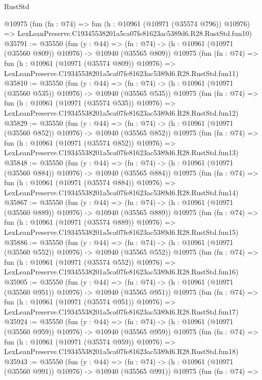 \begin{lexlean}{RustStd}
\begin{coremodule}
    @10975
    (fun (fn : @74) =>
    fun (h : @10961 (@10971 (@35574 @796)) @10976) =>
    LexLeanPreserve.C19345538201a5ca07fe81623ac5389d6.R28.RustStd.fun10)
@35791 := @35550
    (fun (y : @44) =>
    (fn : @74) -> (h : @10961 (@10971 (@35560 @809)) @10976) -> @10940 (@35565 @809))
    @10975
    (fun (fn : @74) =>
    fun (h : @10961 (@10971 (@35574 @809)) @10976) =>
    LexLeanPreserve.C19345538201a5ca07fe81623ac5389d6.R28.RustStd.fun11)
@35810 := @35550
    (fun (y : @44) =>
    (fn : @74) -> (h : @10961 (@10971 (@35560 @535)) @10976) -> @10940 (@35565 @535))
    @10975
    (fun (fn : @74) =>
    fun (h : @10961 (@10971 (@35574 @535)) @10976) =>
    LexLeanPreserve.C19345538201a5ca07fe81623ac5389d6.R28.RustStd.fun12)
@35829 := @35550
    (fun (y : @44) =>
    (fn : @74) -> (h : @10961 (@10971 (@35560 @852)) @10976) -> @10940 (@35565 @852))
    @10975
    (fun (fn : @74) =>
    fun (h : @10961 (@10971 (@35574 @852)) @10976) =>
    LexLeanPreserve.C19345538201a5ca07fe81623ac5389d6.R28.RustStd.fun13)
@35848 := @35550
    (fun (y : @44) =>
    (fn : @74) -> (h : @10961 (@10971 (@35560 @884)) @10976) -> @10940 (@35565 @884))
    @10975
    (fun (fn : @74) =>
    fun (h : @10961 (@10971 (@35574 @884)) @10976) =>
    LexLeanPreserve.C19345538201a5ca07fe81623ac5389d6.R28.RustStd.fun14)
@35867 := @35550
    (fun (y : @44) =>
    (fn : @74) -> (h : @10961 (@10971 (@35560 @889)) @10976) -> @10940 (@35565 @889))
    @10975
    (fun (fn : @74) =>
    fun (h : @10961 (@10971 (@35574 @889)) @10976) =>
    LexLeanPreserve.C19345538201a5ca07fe81623ac5389d6.R28.RustStd.fun15)
@35886 := @35550
    (fun (y : @44) =>
    (fn : @74) -> (h : @10961 (@10971 (@35560 @552)) @10976) -> @10940 (@35565 @552))
    @10975
    (fun (fn : @74) =>
    fun (h : @10961 (@10971 (@35574 @552)) @10976) =>
    LexLeanPreserve.C19345538201a5ca07fe81623ac5389d6.R28.RustStd.fun16)
@35905 := @35550
    (fun (y : @44) =>
    (fn : @74) -> (h : @10961 (@10971 (@35560 @951)) @10976) -> @10940 (@35565 @951))
    @10975
    (fun (fn : @74) =>
    fun (h : @10961 (@10971 (@35574 @951)) @10976) =>
    LexLeanPreserve.C19345538201a5ca07fe81623ac5389d6.R28.RustStd.fun17)
@35924 := @35550
    (fun (y : @44) =>
    (fn : @74) -> (h : @10961 (@10971 (@35560 @959)) @10976) -> @10940 (@35565 @959))
    @10975
    (fun (fn : @74) =>
    fun (h : @10961 (@10971 (@35574 @959)) @10976) =>
    LexLeanPreserve.C19345538201a5ca07fe81623ac5389d6.R28.RustStd.fun18)
@35943 := @35550
    (fun (y : @44) =>
    (fn : @74) -> (h : @10961 (@10971 (@35560 @991)) @10976) -> @10940 (@35565 @991))
    @10975
    (fun (fn : @74) =>

\end{coremodule}
\end{lexlean}
